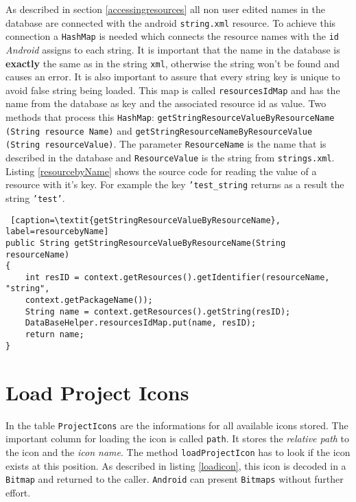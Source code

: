 As described in section \ref{accessingresources} all non user edited names in the database are connected with the android \texttt{string.xml} resource. To achieve this connection a \texttt{HashMap} is needed which connects the resource names with the \texttt{id} \textit{Android} assigns to each string. It is important that the name in the database is \textbf{exactly} the same as in the string \texttt{xml}, otherwise the string won't be found and causes an error. It is also important to assure that every string key is unique to avoid false string being loaded. This map is called \texttt{resourcesIdMap} and has the name from the database as key and the associated resource id as value. Two methods that process this \texttt{HashMap}: \texttt{getStringResourceValueByResourceName} \texttt{(String resource Name)} and \texttt{getStringResourceNameByResourceValue (String resourceValue)}. The parameter \texttt{ResourceName} is the name that is described in the database and \texttt{ResourceValue} is the string from \texttt{strings.xml}.\\
Listing \ref{resourcebyName} shows the source code for reading the value of a resource with it's key. For example the key \texttt{'test\_string} returns as a result the string \texttt{'test'}.
\begin{lstlisting} [caption=\textit{getStringResourceValueByResourceName}, label=resourcebyName] 
public String getStringResourceValueByResourceName(String resourceName)
{
	int resID = context.getResources().getIdentifier(resourceName, "string", 
	context.getPackageName());
	String name = context.getResources().getString(resID);
	DataBaseHelper.resourcesIdMap.put(name, resID);
	return name;
}
\end{lstlisting}

\section{Load Project Icons}\label{impl:loadProjectIcons}

In the table \texttt{ProjectIcons} are the informations for all available icons stored. The important column for loading the icon is called \texttt{path}. It stores the \textit{relative path} to the icon and the \textit{icon name}. The method \texttt{loadProjectIcon} has to look if the icon exists at this position. As described in listing \ref{loadicon}, this icon is decoded in a \texttt{Bitmap} and returned to the caller. \texttt{Android} can present \texttt{Bitmaps} without further effort.

